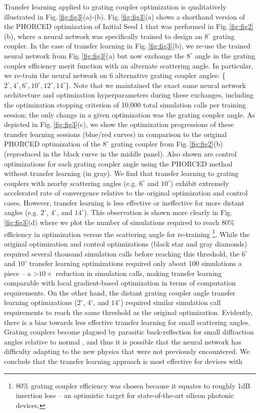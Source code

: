 \documentclass{article}
\begin{document}
Transfer learning applied to grating coupler optimization is qualitatively illustrated in Fig.\,\ref{fig:fig3}(a)-(b). Fig.\,\ref{fig:fig3}(a) shows a shorthand version of the PHORCED optimization of Initial Seed 1 that was performed in Fig.\,\ref{fig:fig2}(b), where a neural network was specifically trained to design an $8^\circ$ grating coupler. In the case of transfer learning in Fig.\,\ref{fig:fig3}(b), we re-use the trained neural network from Fig.\,\ref{fig:fig3}(a) but now exchange the $8^\circ$ angle in the grating coupler efficiency merit function with an alternate scattering angle. In particular, we re-train the neural network on 6 alternative grating coupler angles: \{$2^\circ, 4^\circ, 6^\circ, 10^\circ, 12^\circ, 14^\circ$\}. Note that we maintained the exact same neural network architecture and optimization hyperparameters during these exchanges, including the optimization stopping criterion of 10,000 total simulation calls per training session; the only change in a given optimization was the grating coupler angle. As depicted in Fig.\,\ref{fig:fig3}(c), we show the optimization progressions of these transfer learning sessions (blue/red curves) in comparison to the original PHORCED optimization of the $8^\circ$ grating coupler from Fig.\,\ref{fig:fig2}(b) (reproduced in the black curve in the middle panel). Also shown are control optimizations for each grating coupler angle using the PHORCED method without transfer learning (in gray). We find that transfer learning to grating couplers with nearby scattering angles (e.g. $6^\circ$ and $10^\circ$) exhibit extremely accelerated rate of convergence relative to the original optimization and control cases. However, transfer learning is less effective or ineffective for more distant angles (e.g. $2^\circ$, $4^\circ$, and $14^\circ$). This observation is shown more clearly in Fig.\,\ref{fig:fig3}(d) where we plot the number of simulations required to reach 80\% efficiency in optimization versus the scattering angle for re-training \footnote{80\% grating coupler efficiency was chosen because it equates to roughly 1dB insertion loss -- an optimistic target for state-of-the-art silicon photonic devices.}. While the original optimization and control optimizations (black star and gray diamonds) required several thousand simulation calls before reaching this threshold, the $6^\circ$ and $10^\circ$ transfer learning optimizations required only about 100 simulations a piece -- a \textgreater$10\times$ reduction in simulation calls, making transfer learning comparable with local gradient-based optimization in terms of computation requirements. On the other hand, the distant grating coupler angle transfer learning optimizations ($2^\circ$, $4^\circ$, and $14^\circ$) required similar simulation call requirements to reach the same threshold as the original optimization. Evidently, there is a bias towards less effective transfer learning for small scattering angles. Grating couplers become plagued by parasitic back-reflection for small diffraction angles relative to normal \cite{michaels_inverse_2018,hooten_adjoint_2020}, and thus it is possible that the neural network has difficulty adapting to the new physics that were not previously encountered. We conclude that the transfer learning approach is most effective for devices with 
\end{document}

